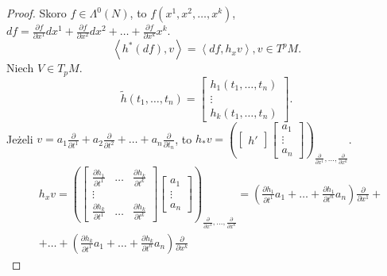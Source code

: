 \documentclass[../main.tex]{subfiles}
\begin{document}

    \begin{proof}
        Skoro $f\in \Lambda^0(N)$, to $f(x^1,x^2,\ldots,x^k)$,\\
        $df = \frac{\partial f}{\partial x^1} dx^1 + \frac{\partial f}{\partial x^2} dx^2 + \ldots + \frac{\partial f}{\partial x^k} x^k$.
        \[
            \left<h^*(df),v \right> = \left<df,h_xv \right>, v\in T^pM
        .\]
        Niech $V\in T_pM$.\\
        \[
            \tilde h(t_1,\ldots,t_n) = \begin{bmatrix} h_1(t_1,\ldots,t_n)\\ \vdots \\ h_k(t_1,\ldots,t_n) \end{bmatrix}
        .\]
        Jeżeli $v = a_1 \frac{\partial }{\partial t^1} + a_2 \frac{\partial }{\partial t^2} + \ldots + a_n \frac{\partial }{\partial t_n} $, to $h_*v = \left( \begin{bmatrix} h' \end{bmatrix} \begin{bmatrix} a_1\\ \vdots \\ a_n \end{bmatrix}  \right)_{\frac{\partial }{\partial x^1} , \ldots, \frac{\partial }{\partial x^k} } $.\\
        \begin{align*}
            &h_xv = \left( \begin{bmatrix} \frac{\partial h_1}{\partial t^1} & \ldots & \frac{\partial h_k}{\partial t^k} \\ \vdots \\ \frac{\partial h_k}{\partial t^1} & \ldots & \frac{\partial h_k}{\partial t^k}  \end{bmatrix} \begin{bmatrix} a_1 \\ \vdots \\ a_n \end{bmatrix}  \right)_{\frac{\partial }{\partial x^1} ,\ldots, \frac{\partial }{\partial x^k} } = \left( \frac{\partial h_1}{\partial t^1} a_1 + \ldots + \frac{\partial h_1}{\partial t^n} a_n \right) \frac{\partial }{\partial x^1} +\\
&+ \ldots + \left( \frac{\partial h_k}{\partial t^1} a_1 + \ldots + \frac{\partial h_k}{\partial t^n} a_n \right) \frac{\partial }{\partial x^k}

\end{align*}
\end{proof}
\end{document}
